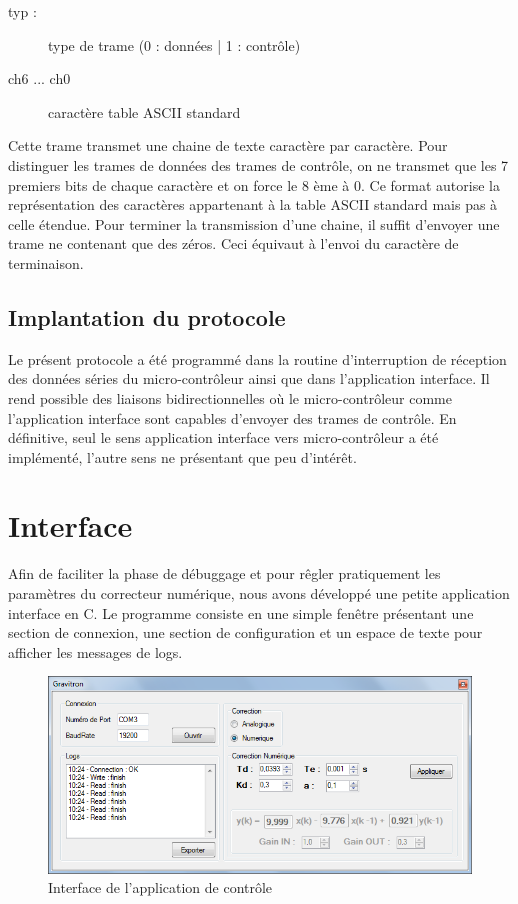 \documentclass[11pt, french]{article} %
\begin{document}
\begin{itemize}
		\begin{description}
			\item[typ :] type de trame (0 : données | 1 : contrôle)
			\item[ch6 ... ch0] caractère table ASCII standard
		\end{description}

		Cette trame transmet une chaine de texte caractère par caractère. Pour distinguer les trames de données des trames de contrôle, on ne transmet que les 7 premiers bits de chaque caractère et on force le 8 ème à 0. Ce format autorise la représentation des caractères appartenant à la table ASCII standard mais pas à celle étendue. Pour terminer la transmission d'une chaine, il suffit d'envoyer une trame ne contenant que des zéros. Ceci équivaut à l'envoi du caractère de terminaison.

\end{itemize}

\subsection{Implantation du protocole}
Le présent protocole a été programmé dans la routine d'interruption de réception des données séries du micro-contrôleur ainsi que dans l'application interface. Il rend possible des liaisons bidirectionnelles où le micro-contrôleur comme l'application interface sont capables d'envoyer des trames de contrôle. En définitive, seul le sens application interface vers micro-contrôleur a été implémenté, l'autre sens ne présentant que peu d'intérêt.

\section{Interface}
Afin de faciliter la phase de débuggage et pour rêgler pratiquement les paramètres du correcteur numérique, nous avons développé une petite application interface en C. Le programme consiste en une simple fenêtre présentant une section de connexion, une section de configuration et un espace de texte pour afficher les messages de logs.

\begin{figure}[h!]
	\centering
	\includegraphics[width = 12cm]{SolutionNumerique/IHM.png} 
	\caption{Interface de l'application de contrôle}
\end{figure}
\end{document}
